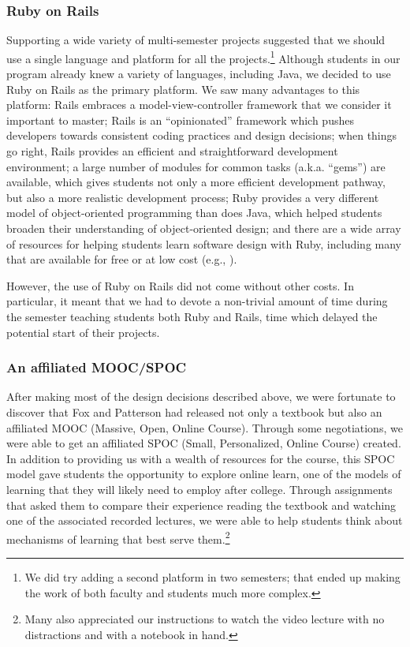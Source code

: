 
\subsubsection{Ruby on Rails}

Supporting a wide variety of multi-semester projects suggested that
we should use a single language and platform for all the
projects.\footnote{We did try adding a second platform in two
semesters; that ended up making the work of both faculty and students
much more complex.}  Although students in our program already knew
a variety of languages, including Java, we decided to use Ruby on
Rails as the primary platform.  We saw many advantages to this
platform: Rails embraces a model-view-controller framework that we
consider it important to master; Rails is an ``opinionated'' framework 
which pushes developers towards consistent coding practices and 
design decisions; when things go right, Rails
provides an efficient and straightforward development environment;
a large number of modules for common tasks (a.k.a. ``gems'') are
available, which gives students not only a more efficient development
pathway, but also a more realistic development process; Ruby
provides a very different model of object-oriented programming than
does Java, which helped students broaden their understanding of
object-oriented design; and there are a wide array of resources for
helping students learn software design with Ruby, including many
that are available for free or at low cost (e.g.,
\cite{saasbook,rails-tutorial}).

However, the use of Ruby on Rails did not come without other costs.  In
particular, it meant that we had to devote a non-trivial amount of
time during the semester teaching students both Ruby and Rails, time
which delayed the potential start of their projects.

\subsubsection{An affiliated MOOC/SPOC}

After making most of the design decisions described above, we were
fortunate to discover that Fox and Patterson had released not only
a textbook \cite{saasbook} but also an affiliated MOOC (Massive,
Open, Online Course).  Through some negotiations, we were able to
get an affiliated SPOC (Small, Personalized, Online Course) created.
In addition to providing us with a wealth of resources for the
course, this SPOC model gave students the opportunity to explore
online learn, one of the models of learning that they will likely
need to employ after college.  Through assignments that asked them
to compare their experience reading the textbook and watching one
of the associated recorded lectures, we were able to help students
think about mechanisms of learning that best serve them.\footnote{Many also
appreciated our instructions to watch the video lecture with no distractions
and with a notebook in hand.}

